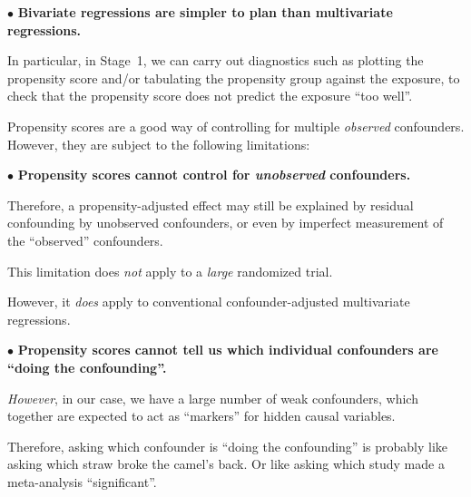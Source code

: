\item{$\bullet$} {\bf Bivariate regressions are simpler to plan
than multivariate regressions.}

\itemitem{$-$} In particular, in Stage~1, we can carry out diagnostics
such as plotting the propensity score and/or tabulating the propensity group against the
exposure, to check that the propensity score does not predict the exposure ``too well''.

\enditems

\vfill\eject
\vfill


Propensity scores are a good way of controlling for multiple {\it observed} confounders.
However, they are subject to the following limitations:

\beginitems

\item{$\bullet$} {\bf Propensity scores cannot control for {\it unobserved} confounders.}

\itemitem{$-$} Therefore, a propensity-adjusted effect may still be explained by residual confounding
by unobserved confounders, or even by imperfect measurement of the ``observed'' confounders.

\itemitem{$-$} This limitation does {\it not} apply to a {\it large} randomized trial.

\itemitem{$-$} However, it {\it does} apply to conventional confounder-adjusted multivariate regressions.

\item{$\bullet$} {\bf Propensity scores cannot tell us which individual confounders are ``doing the confounding''.}

\itemitem{$-$} {\it However}, in our case, we have a large number of weak confounders, which together
are expected to act as ``markers'' for hidden causal variables.

\itemitem{$-$} Therefore, asking which confounder is ``doing the confounding''
is probably like asking which straw broke the camel's back.
Or like asking which study made a meta-analysis ``significant''.

\enditems

\vfill\eject

\bye
